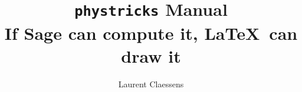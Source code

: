 \documentclass[a4paper]{article}
\begin{document}
\title{\texttt{phystricks} Manual\\If Sage can compute it, \LaTeX\ can draw it}
\author{Laurent Claessens}
\maketitle

\tableofcontents


\end{document}
